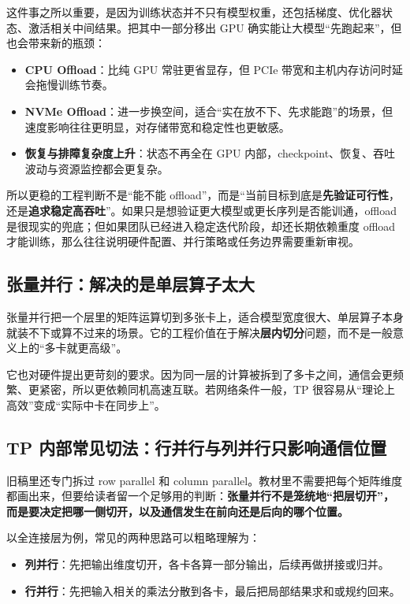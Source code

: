 这件事之所以重要，是因为训练状态并不只有模型权重，还包括梯度、优化器状态、激活相关中间结果。把其中一部分移出 GPU 确实能让大模型“先跑起来”，但也会带来新的瓶颈：
\begin{itemize}
  \item \textbf{CPU Offload}：比纯 GPU 常驻更省显存，但 PCIe 带宽和主机内存访问时延会拖慢训练节奏。
  \item \textbf{NVMe Offload}：进一步换空间，适合“实在放不下、先求能跑”的场景，但速度影响往往更明显，对存储带宽和稳定性也更敏感。
  \item \textbf{恢复与排障复杂度上升}：状态不再全在 GPU 内部，checkpoint、恢复、吞吐波动与资源监控都会更复杂。
\end{itemize}

所以更稳的工程判断不是“能不能 offload”，而是“当前目标到底是\textbf{先验证可行性}，还是\textbf{追求稳定高吞吐}”。如果只是想验证更大模型或更长序列是否能训通，offload 是很现实的兜底；但如果团队已经进入稳定迭代阶段，却还长期依赖重度 offload 才能训练，那么往往说明硬件配置、并行策略或任务边界需要重新审视。

\subsection{张量并行：解决的是单层算子太大}
张量并行把一个层里的矩阵运算切到多张卡上，适合模型宽度很大、单层算子本身就装不下或算不过来的场景。它的工程价值在于解决\textbf{层内切分}问题，而不是一般意义上的“多卡就更高级”。

它也对硬件提出更苛刻的要求。因为同一层的计算被拆到了多卡之间，通信会更频繁、更紧密，所以更依赖同机高速互联。若网络条件一般，TP 很容易从“理论上高效”变成“实际中卡在同步上”。

\subsection{TP 内部常见切法：行并行与列并行只影响通信位置}
旧稿里还专门拆过 row parallel 和 column parallel。教材里不需要把每个矩阵维度都画出来，但要给读者留一个足够用的判断：\textbf{张量并行不是笼统地“把层切开”，而是要决定把哪一侧切开，以及通信发生在前向还是后向的哪个位置。}

以全连接层为例，常见的两种思路可以粗略理解为：
\begin{itemize}
  \item \textbf{列并行}：先把输出维度切开，各卡各算一部分输出，后续再做拼接或归并。
  \item \textbf{行并行}：先把输入相关的乘法分散到各卡，最后把局部结果求和或规约回来。
\end{itemize}

